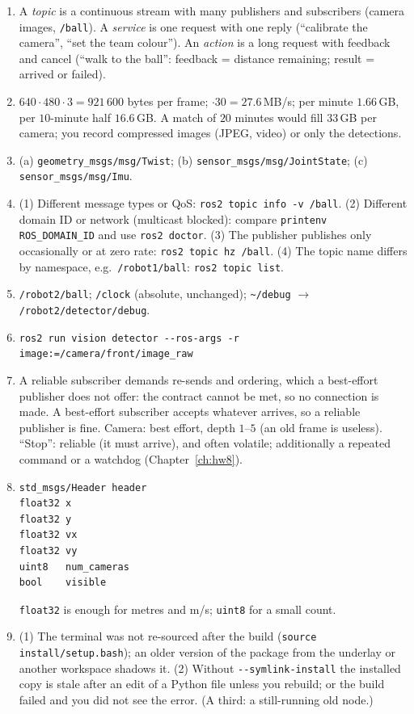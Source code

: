 \begin{enumerate}[label=\textbf{\ansnum.\arabic*}]
  \item A \emph{topic} is a continuous stream with many publishers and subscribers (camera images, \verb!/ball!). A \emph{service} is one request with one reply (``calibrate the camera'', ``set the team colour''). An \emph{action} is a long request with feedback and cancel (``walk to the ball'': feedback = distance remaining; result = arrived or failed).
  \item $640\cdot480\cdot3=921\,600$ bytes per frame; $\cdot30=27.6$\,MB/s; per minute $1.66$\,GB, per $10$-minute half $16.6$\,GB. A match of $20$ minutes would fill $33$\,GB per camera; you record compressed images (JPEG, video) or only the detections.
  \item (a) \verb!geometry_msgs/msg/Twist!; (b) \verb!sensor_msgs/msg/JointState!; (c) \verb!sensor_msgs/msg/Imu!.
  \item (1) Different message types or QoS: \verb!ros2 topic info -v /ball!. (2) Different domain ID or network (multicast blocked): compare \verb!printenv ROS_DOMAIN_ID! and use \verb!ros2 doctor!. (3) The publisher publishes only occasionally or at zero rate: \verb!ros2 topic hz /ball!. (4) The topic name differs by namespace, e.g.\ \verb!/robot1/ball!: \verb!ros2 topic list!.
  \item \verb!/robot2/ball!; \verb!/clock! (absolute, unchanged); \texttt{\textasciitilde/debug} $\to$ \verb!/robot2/detector/debug!.
  \item \verb!ros2 run vision detector --ros-args -r image:=/camera/front/image_raw!
  \item A reliable subscriber demands re-sends and ordering, which a best-effort publisher does not offer: the contract cannot be met, so no connection is made. A best-effort subscriber accepts whatever arrives, so a reliable publisher is fine. Camera: best effort, depth $1$--$5$ (an old frame is useless). ``Stop'': reliable (it must arrive), and often volatile; additionally a repeated command or a watchdog (Chapter~\ref{ch:hw8}).
  \item
\begin{verbatim}
std_msgs/Header header
float32 x
float32 y
float32 vx
float32 vy
uint8   num_cameras
bool    visible
\end{verbatim}
  \verb!float32! is enough for metres and m/s; \verb!uint8! for a small count.
  \item (1) The terminal was not re-sourced after the build (\verb!source install/setup.bash!); an older version of the package from the underlay or another workspace shadows it. (2) Without \verb!--symlink-install! the installed copy is stale after an edit of a Python file unless you rebuild; or the build failed and you did not see the error. (A third: a still-running old node.)

\end{enumerate}
